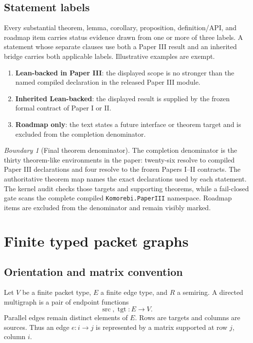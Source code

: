 \documentclass[11pt]{article}
\theoremstyle{definition}
\theoremstyle{remark}
\newtheorem{boundary}[theorem]{Boundary}
\newcommand{\src}{\operatorname{src}}
\newcommand{\tgt}{\operatorname{tgt}}
\newcommand{\leanname}[1]{\nolinkurl{#1}}
\begin{document}
\subsection{Statement labels}

Every substantial theorem, lemma, corollary, proposition, definition/API, and
roadmap item carries status evidence drawn from one or more of three labels.
A statement
whose separate clauses use both a Paper III result and an inherited bridge
carries both applicable labels.  Illustrative examples are exempt.
\begin{enumerate}[label=\textbf{S\arabic*.},leftmargin=3.2em]
\item \textbf{Lean-backed in Paper III}: the displayed scope is no stronger
than the named compiled declaration in the released Paper III module.
\item \textbf{Inherited Lean-backed}: the displayed result is supplied by the
frozen formal contract of Paper I or II.
\item \textbf{Roadmap only}: the text states a future interface or theorem
target and is excluded from the completion denominator.
\end{enumerate}

\begin{boundary}[Final theorem denominator]
The completion denominator is the thirty theorem-like environments in the
paper: twenty-six resolve to compiled Paper III declarations and four resolve
to the frozen Papers I--II contracts.  The authoritative theorem map names the
exact declarations used by each statement.  The kernel audit checks those
targets and supporting theorems, while a fail-closed gate scans the complete
compiled \leanname{Komorebi.PaperIII} namespace.  Roadmap items are excluded
from the denominator and remain visibly marked.
\end{boundary}

\section{Finite typed packet graphs}
\label{sec:edge-operators}

\subsection{Orientation and matrix convention}

Let $V$ be a finite packet type, $E$ a finite edge type, and $R$ a semiring.
A directed multigraph is a pair of endpoint functions
\[
  \src,\tgt:E\longrightarrow V.
\]
Parallel edges remain distinct elements of $E$.  Rows are targets and columns
are sources.  Thus an edge $e:i\to j$ is represented by a matrix supported at
row $j$, column $i$.
\end{document}
